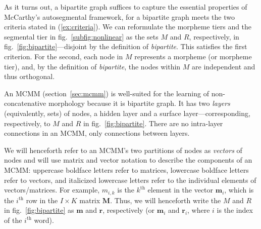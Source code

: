 As it turns out, a bipartite graph suffices
to capture the essential properties of McCarthy's autosegmental
framework,
for a bipartite graph meets the two criteria stated in
(\ref{ex:criteria}).  We can reformulate the morpheme tiers and the
segmental tier in fig.~\ref{subfig:nonlinear} as the sets $M$ and
$R$, respectively, in fig.~\ref{fig:bipartite}---disjoint
by the definition of \emph{bipartite}. This satisfies the first
criterion. For the second, each node in $M$ represents a morpheme (or
morpheme tier), and, by the definition of \emph{bipartite}, the nodes
within $M$ are independent and thus orthogonal.

An MCMM (section~\ref{sec:mcmm}) is well-suited for the learning of
non-concatenative morphology because it is bipartite graph. It has two
\emph{layers} (equivalently, sets) of nodes, a hidden layer and a
surface layer---corresponding, respectively, to $M$ and $R$ in
fig.~\ref{fig:bipartite}. There are no intra-layer connections in an
MCMM, only connections between layers.

We will henceforth refer to an MCMM's two partitions of nodes as
\emph{vectors} of nodes and will use matrix and vector notation to
describe the components of an MCMM:
uppercase boldface letters refer to matrices, %
lowercase boldface letters refer to vectors,
and italicized lowercase letters refer to the individual elements
of vectors/matrices. %
For example, $m_{i,k}$ is the $k^{\text{th}}$ element in the vector
$\mathbf{m}_i$, which is the $i^{\text{th}}$ row in the $I \times K$ matrix
$\mathbf{M}$. Thus, we will henceforth write the $M$ and $R$ in
fig.~\ref{fig:bipartite} as $\mathbf{m}$ and $\mathbf{r}$,
respectively (or $\mathbf{m}_i$ and $\mathbf{r}_i$, where $i$ is the
index of the $i^{\text{th}}$ word).

